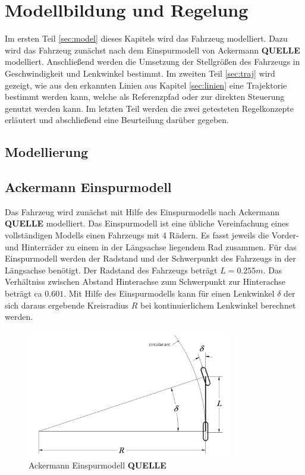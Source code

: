 \section{Modellbildung und Regelung}
\label{sec:modelCtrl}
Im ersten Teil \ref{sec:model} dieses Kapitels wird das Fahrzeug modelliert. Dazu wird das Fahrzeug zunächst nach dem Einspurmodell von Ackermann \textbf{QUELLE} modelliert. Anschließend werden die Umsetzung der Stellgrößen des Fahrzeugs in Geschwindigkeit und Lenkwinkel bestimmt. Im zweiten Teil \ref{sec:traj} wird gezeigt, wie aus den erkannten Linien aus Kapitel \ref{sec:linien} eine Trajektorie bestimmt werden kann, welche als Referenzpfad oder zur direkten Steuerung genutzt werden kann. Im letzten Teil werden die zwei getesteten Regelkonzepte erläutert und abschließend eine Beurteilung darüber gegeben.
\subsection{Modellierung}
\subsection*{Ackermann Einspurmodell}\label{sec:model}
Das Fahrzeug wird zunächst mit Hilfe des Einspurmodells nach Ackermann \textbf{QUELLE} modelliert. Das Einspurmodell ist eine übliche Vereinfachung eines vollständigen Modells einen Fahrzeugs mit 4 Rädern. Es fasst jeweils die Vorder- und Hinterräder zu einem in der Längsachse liegendem Rad zusammen. Für das Einspurmodell werden der Radstand und der Schwerpunkt des Fahrzeugs in der Längsachse benötigt. Der Radstand des Fahrzeugs beträgt $L = 0.255 m$. Das Verhältniss zwischen Abstand Hinterachse zum Schwerpunkt zur Hinterachse beträgt ca $0.601$. Mit Hilfe des Einspurmodells kann für einen Lenkwinkel $\delta$ der sich daraus ergebende Kreisradius $R$ bei kontinuierlichem Lenkwinkel berechnet werden.

\begin{figure}[h]
\centering
\includegraphics[width = 0.8\textwidth]{../images/ackermann.png}
\caption{Ackermann Einspurmodell \textbf{QUELLE}}
\end{figure}	
	
